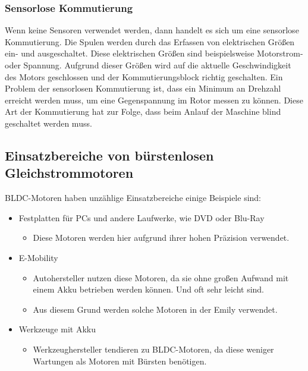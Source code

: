 \subsubsection{Sensorlose Kommutierung}
Wenn keine Sensoren verwendet werden, dann handelt es sich um eine sensorlose Kommutierung. Die Spulen werden durch das Erfassen von elektrischen Grö{\ss}en ein- und ausgeschaltet. Diese elektrischen Grö{\ss}en sind beispielsweise Motorstrom- oder Spannung. Aufgrund dieser Grö{\ss}en wird auf die aktuelle Geschwindigkeit des Motors geschlossen und der Kommutierungsblock richtig geschalten. Ein Problem der sensorlosen Kommutierung ist, dass ein Minimum an Drehzahl erreicht werden muss, um eine Gegenspannung im Rotor messen zu können. Diese Art der Kommutierung hat zur Folge, dass beim Anlauf der Maschine blind geschaltet werden muss. 
\cite{wiki:BLDC}
\cite{SPSM:SLKomm}
\subsection{Einsatzbereiche von bürstenlosen Gleichstrommotoren}
BLDC-Motoren haben unzählige Einsatzbereiche einige Beispiele sind: \cite{wiki:BLDC}
\begin{itemize}
    \item Festplatten für PCs und andere Laufwerke, wie DVD oder Blu-Ray \cite{ASPINA:BLDC}
    \begin{itemize}
        \item Diese Motoren werden hier aufgrund ihrer hohen Präzision verwendet. \cite{ASPINA:BLDC}
\end{itemize}
\end{itemize}
\begin{itemize}
    \item E-Mobility \cite{wiki:BLDC}
    \begin{itemize}
        \item Autohersteller nutzen diese Motoren, da sie ohne gro{\ss}en Aufwand mit einem Akku betrieben werden können. 
         Und oft sehr leicht sind. \cite{wiki:BLDC}
        \item Aus diesem Grund werden solche Motoren in der Emily verwendet. 
\end{itemize}
\end{itemize}
\begin{itemize}
    \item Werkzeuge mit Akku \cite{wiki:BLDC}
    \begin{itemize}
        \item Werkzeughersteller tendieren zu BLDC-Motoren, da diese weniger Wartungen als Motoren mit Bürsten benötigen. \cite{wiki:BLDC}
\end{itemize}
\end{itemize}
